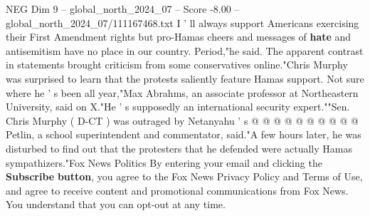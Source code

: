 \begin{textsample}{NEG Dim 9 – global\_north\_2024\_07 – Score -8.00 – global\_north\_2024\_07/111167468.txt}
I ' ll always support Americans exercising their First Amendment rights but pro-Hamas cheers and messages of \textbf{hate} and antisemitism have no place in our country.
Period,"he said.
The apparent contrast in statements brought criticism from some conservatives online."Chris Murphy was surprised to learn that the protests saliently feature Hamas support.
Not sure where he ' s been all year,"Max Abrahms, an associate professor at Northeastern University, said on X."He ' s supposedly an international security expert.""Sen.
Chris Murphy ( D-CT ) was outraged by Netanyahu ' s @ @ @ @ @ @ @ @ @ @ Petlin, a school superintendent and commentator, said."A few hours later, he was disturbed to find out that the protesters that he defended were actually Hamas sympathizers."Fox News Politics By entering your email and clicking the \textbf{Subscribe} \textbf{button}, you agree to the Fox News Privacy Policy and Terms of Use, and agree to receive content and promotional communications from Fox News.
You understand that you can opt-out at any time.

\end{textsample}
